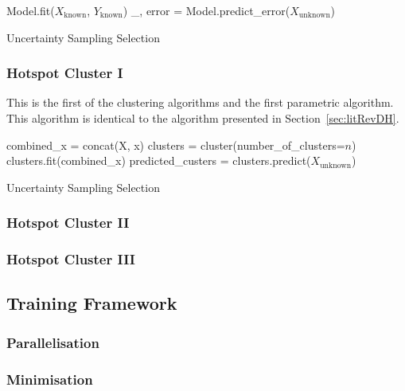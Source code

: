 \begin{algorithm}[h]
    Model.fit($X_\mathrm{known}$, $Y_\mathrm{known}$)\;
    \_, error = Model.predict\_error($X_\mathrm{unknown}$)\;
    \caption{Uncertainty Sampling Selection}
    \label{alg:rod}\SetAlgoLined
\end{algorithm}

\subsubsection{Hotspot Cluster I}
This is the first of the clustering algorithms and the first parametric algorithm. This algorithm is identical to the algorithm presented in Section~\ref{sec:litRevDH}.

\begin{algorithm}[h]
    combined\_x = concat(X, x)\;
    clusters = cluster(number\_of\_clusters=$n$)\;
    clusters.fit(combined\_x)\;
    predicted\_custers = clusters.predict($X_\mathrm{unknown}$)

    \caption{Uncertainty Sampling Selection}
    \label{alg:cluster1}\SetAlgoLined
\end{algorithm}

\subsubsection{Hotspot Cluster II}

\subsubsection{Hotspot Cluster III}

\subsection{Training Framework}
\blindtext[1]
\subsubsection{Parallelisation}
\blindtext[1]
\subsubsection{Minimisation}
\blindtext[1]